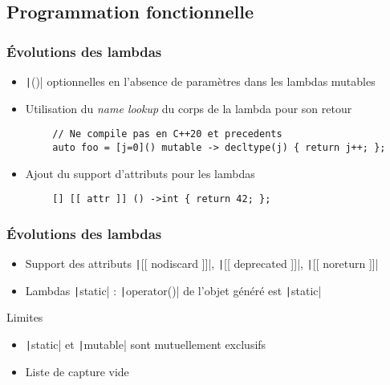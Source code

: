 \documentclass[C++.tex]{subfiles}
\begin{document}
\subsection*{Programmation fonctionnelle}
\begin{frame}[fragile]
	\frametitle{Évolutions des lambdas}
	\begin{itemize}
		\item \texttt|()| optionnelles en l'absence de paramètres dans les lambdas mutables


		\item Utilisation du \textit{name lookup} du corps de la lambda pour son retour
	\end{itemize}

	\begin{verbatim}
		// Ne compile pas en C++20 et precedents
		auto foo = [j=0]() mutable -> decltype(j) { return j++; };
	\end{verbatim}


	\begin{itemize}
		\item Ajout du support d'attributs pour les lambdas
	\end{itemize}

	\begin{verbatim}
		[] [[ attr ]] () ->int { return 42; };
	\end{verbatim}
\end{frame}

\begin{frame}[fragile]
	\frametitle{Évolutions des lambdas}
	\begin{itemize}
		\item Support des attributs \texttt|[[ nodiscard ]]|, \texttt|[[ deprecated ]]|, \texttt|[[ noreturn ]]|
		\item Lambdas \texttt|static| : \texttt|operator()| de l'objet généré est \texttt|static|
	\end{itemize}
	
	\begin{alertblock}{Limites}
		\begin{itemize}
			\item \texttt|static| et \texttt|mutable| sont mutuellement exclusifs
			\item Liste de capture vide
		\end{itemize}
	\end{alertblock}
\end{frame}
\end{document}
